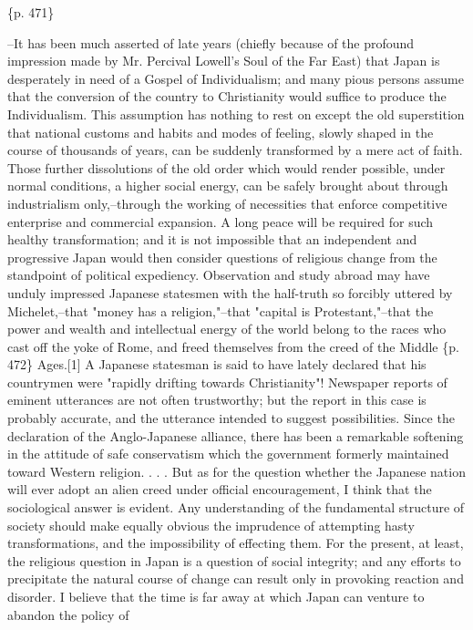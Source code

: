 \{p. 471\}

--It has been much asserted of late years (chiefly because of the profound impression made by Mr. Percival Lowell's Soul of the Far East) that Japan is desperately in need of a Gospel of Individualism; and many pious persons assume that the conversion of the country to Christianity would suffice to produce the Individualism. This assumption has nothing to rest on except the old superstition that national customs and habits and modes of feeling, slowly shaped in the course of thousands of years, can be suddenly transformed by a mere act of faith. Those further dissolutions of the old order which would render possible, under normal conditions, a higher social energy, can be safely brought about through industrialism only,--through the working of necessities that enforce competitive enterprise and commercial expansion. A long peace will be required for such healthy transformation; and it is not impossible that an independent and progressive Japan would then consider questions of religious change from the standpoint of political expediency. Observation and study abroad may have unduly impressed Japanese statesmen with the half-truth so forcibly uttered by Michelet,--that "money has a religion,"--that "capital is Protestant,"--that the power and wealth and intellectual energy of the world belong to the races who cast off the yoke of Rome, and freed themselves from the creed of the Middle \{p. 472\} Ages.[1] A Japanese statesman is said to have lately declared that his countrymen were "rapidly drifting towards Christianity"! Newspaper reports of eminent utterances are not often trustworthy; but the report in this case is probably accurate, and the utterance intended to suggest possibilities. Since the declaration of the Anglo-Japanese alliance, there has been a remarkable softening in the attitude of safe conservatism which the government formerly maintained toward Western religion. . . . But as for the question whether the Japanese nation will ever adopt an alien creed under official encouragement, I think that the sociological answer is evident. Any understanding of the fundamental structure of society should make equally obvious the imprudence of attempting hasty transformations, and the impossibility of effecting them. For the present, at least, the religious question in Japan is a question of social integrity; and any efforts to precipitate the natural course of change can result only in provoking reaction and disorder. I believe that the time is far away at which Japan can venture to abandon the policy of

